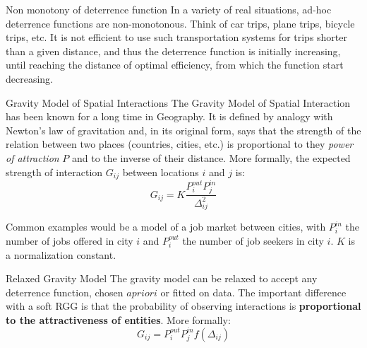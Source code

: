 \documentclass[a4paper,11pt]{book}
\begin{document}
\begin{textbox}{Non monotony of deterrence function}
In a variety of real situations, ad-hoc deterrence functions are non-monotonous. Think of car trips, plane trips, bicycle trips, etc. It is not efficient to use such transportation systems for trips shorter than a given distance, and thus the deterrence function is initially increasing, until reaching the distance of optimal efficiency, from which the function start decreasing.
\end{textbox}










\begin{textbox}{Gravity Model of Spatial Interactions}
The Gravity Model of Spatial Interaction has been known for a long time in Geography. It is defined by analogy with Newton's law of gravitation and, in its original form, says that the strength of the relation between two places (countries, cities, etc.) is proportional to they \textit{power of attraction} $P$ and to the inverse of their distance. More formally, the expected strength of interaction $G_{ij}$ between locations $i$ and $j$ is:
\[
G_{ij}=K\frac{P_i^{out}P_j^{in}}{\Delta_{ij}^2}
\]

Common examples would be a model of a job market between cities, with $P_i^{in}$ the number of jobs offered in city $i$ and $P_i^{out}$ the number of job seekers in city $i$. $K$ is a normalization constant.
\end{textbox}



\begin{textbox}{Relaxed Gravity Model}
The gravity model can be relaxed to accept any deterrence function, chosen $a priori$ or fitted on data. The important difference with a soft RGG is that the probability of observing interactions is \textbf{proportional to the attractiveness of entities}. More formally:
\[
G_{ij}=P_i^{out}P_j^{in}f(\Delta_{ij})
\]
\end{textbox}
\end{document}
